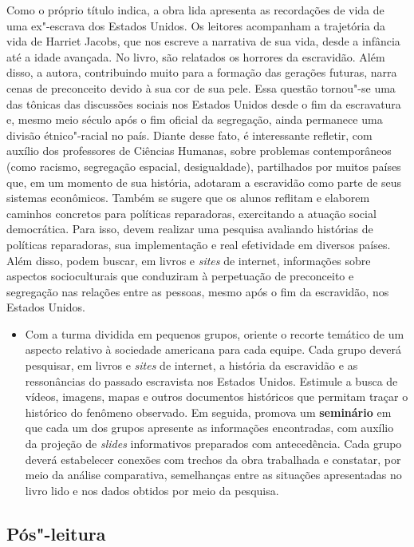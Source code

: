 \documentclass[12pt]{extarticle}
\begin{document}
Como o próprio título indica, a obra lida apresenta as
recordações de vida de uma ex"-escrava dos Estados Unidos. Os leitores
acompanham a trajetória da vida de Harriet Jacobs, que nos escreve a
narrativa de sua vida, desde a infância até a idade avançada. No livro,
são relatados os horrores da escravidão. Além disso, a autora,
contribuindo muito para a formação das gerações futuras, narra cenas de
preconceito devido à sua cor de sua pele. Essa questão tornou"-se uma das
tônicas das discussões sociais nos Estados Unidos desde o fim da
escravatura e, mesmo meio século após o fim oficial da segregação, ainda
permanece uma divisão étnico"-racial no país. Diante desse fato, é
interessante refletir, com auxílio dos professores de Ciências Humanas,
sobre problemas contemporâneos (como racismo, segregação espacial,
desigualdade), partilhados por muitos países que, em um momento de sua
história, adotaram a escravidão como parte de seus sistemas econômicos.
Também se sugere que os alunos reflitam e elaborem caminhos concretos
para políticas reparadoras, exercitando a atuação social democrática.
Para isso, devem realizar uma pesquisa avaliando histórias de políticas
reparadoras, sua implementação e real efetividade em diversos países.
Além disso, podem buscar, em livros e \emph{sites} de internet,
informações sobre aspectos socioculturais que conduziram à perpetuação
de preconceito e segregação nas relações entre as pessoas, mesmo após o
fim da escravidão, nos Estados Unidos.

\begin{itemize}
\item
  Com a turma dividida em pequenos grupos, oriente o recorte temático de
  um aspecto relativo à sociedade americana para cada equipe. Cada grupo
  deverá pesquisar, em livros e \emph{sites} de internet, a história da
  escravidão e as ressonâncias do passado escravista nos Estados Unidos.
  Estimule a busca de vídeos, imagens, mapas e outros documentos
  históricos que permitam traçar o histórico do fenômeno observado. Em
  seguida, promova um \textbf{seminário} em que cada um dos grupos
  apresente as informações encontradas, com auxílio da projeção de
  \emph{slides} informativos preparados com antecedência. Cada grupo
  deverá estabelecer conexões com trechos da obra trabalhada e
  constatar, por meio da análise comparativa, semelhanças entre as
  situações apresentadas no livro lido e nos dados obtidos por meio da
  pesquisa.
\end{itemize}

\subsection{Pós"-leitura}
\end{document}
